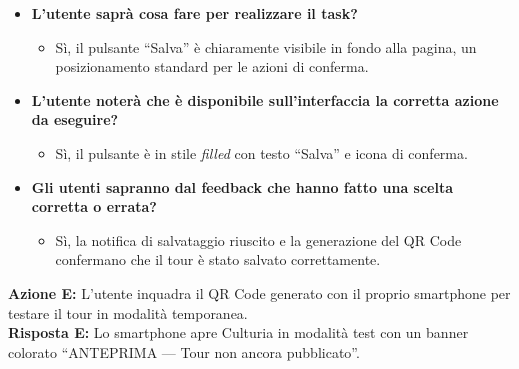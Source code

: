 \begin{itemize}[nosep, leftmargin=1.6em]
    \item \textbf{L'utente saprà cosa fare per realizzare il task?}
    \begin{itemize}[nosep, leftmargin=1.6em]
        \item Sì, il pulsante ``Salva'' è chiaramente visibile in fondo alla pagina, un posizionamento standard per le azioni di conferma.
    \end{itemize}
    \item \textbf{L'utente noterà che è disponibile sull'interfaccia la corretta azione da eseguire?}
    \begin{itemize}[nosep, leftmargin=1.6em]
        \item Sì, il pulsante è in stile \textit{filled} con testo ``Salva'' e icona di conferma.
    \end{itemize}
    \item \textbf{Gli utenti sapranno dal feedback che hanno fatto una scelta corretta o errata?}
    \begin{itemize}[nosep, leftmargin=1.6em]
        \item Sì, la notifica di salvataggio riuscito e la generazione del QR Code confermano che il tour è stato salvato correttamente.
    \end{itemize}
\end{itemize}

\vspace{0.3cm}
\noindent\textbf{Azione E:} L'utente inquadra il QR Code generato con il proprio smartphone per testare il tour in modalità temporanea.\\
\textbf{Risposta E:} Lo smartphone apre Culturia in modalità test con un banner colorato ``ANTEPRIMA --- Tour non ancora pubblicato''.

